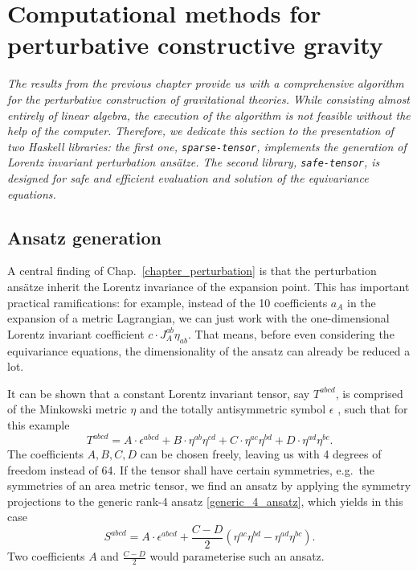 \chapter{Computational methods for perturbative constructive gravity}
\label{chapter_computational_methods}

\textit{The results from the previous chapter provide us with a comprehensive algorithm for the perturbative construction of gravitational theories. While consisting almost entirely of linear algebra, the execution of the algorithm is not feasible without the help of the computer. Therefore, we dedicate this section to the presentation of two Haskell libraries: the first one, \texttt{sparse-tensor}, implements the generation of Lorentz invariant perturbation ansätze. The second library, \texttt{safe-tensor}, is designed for safe and efficient evaluation and solution of the equivariance equations.}

\section{Ansatz generation}
A central finding of Chap.~\ref{chapter_perturbation} is that the perturbation ansätze inherit the Lorentz invariance of the expansion point. This has important practical ramifications: for example, instead of the 10 coefficients $a_A$ in the expansion of a metric Lagrangian, we can just work with the one-dimensional Lorentz invariant coefficient $c\cdot J_A^{ab} \eta_{ab}$. That means, before even considering the equivariance equations, the dimensionality of the ansatz can already be reduced a lot.

It can be shown that a constant Lorentz invariant tensor, say $T^{abcd}$, is comprised of the Minkowski metric $\eta$ and the totally antisymmetric symbol $\epsilon$ \cite{}, such that for this example
\begin{equation}\label{generic_4_ansatz}
  T^{abcd} = A \cdot \epsilon^{abcd} + B \cdot \eta^{ab} \eta^{cd} + C \cdot \eta^{ac} \eta^{bd} + D \cdot \eta^{ad} \eta^{bc}.
\end{equation}
The coefficients $A,B,C,D$ can be chosen freely, leaving us with 4 degrees of freedom instead of 64. If the tensor shall have certain symmetries, e.g.\ the symmetries of an area metric tensor, we find an ansatz by applying the symmetry projections to the generic rank-4 ansatz \eqref{generic_4_ansatz}, which yields in this case
\begin{equation}
  S^{abcd} = A \cdot \epsilon^{abcd} + \frac{C - D}{2} \left( \eta^{ac}\eta^{bd} - \eta^{ad}\eta^{bc} \right).
\end{equation}
Two coefficients $A$ and $\frac{C-D}{2}$ would parameterise such an ansatz.

